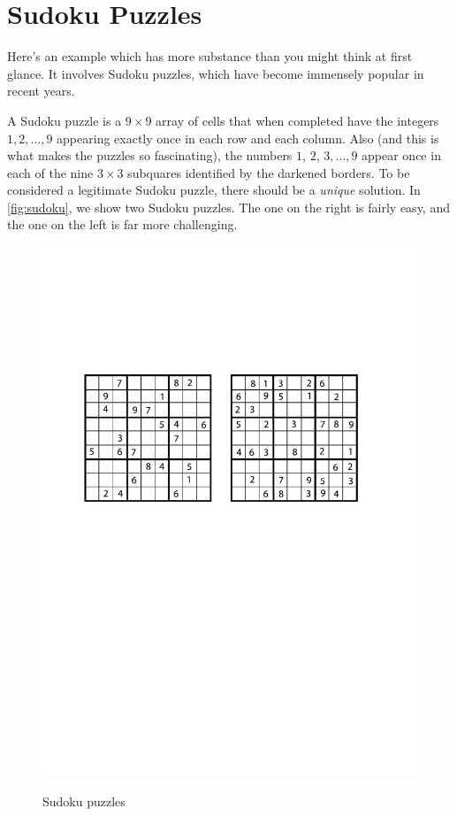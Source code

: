 \section{Sudoku Puzzles}\label{s:intro:sudoku}

Here's an example which has more substance than you might
think at first glance.  It involves Sudoku puzzles, which
have become immensely popular in recent years.
\begin{example}
  A Sudoku puzzle is a $9\times 9$ array of cells that when completed
  have the integers $1,2,\dots,9$ appearing exactly once in each row
  and each column.  Also (and this is what makes the puzzles so
  fascinating), the numbers $1$, $2$, $3,\dots,9$ appear once in each
  of the nine $3\times 3$ subquares identified by the darkened
  borders.  To be considered a legitimate Sudoku puzzle, there should
  be a \textit{unique} solution.  In \autoref{fig:sudoku}, we show two
  Sudoku puzzles.  The one on the right is fairly easy, and the one on
  the left is far more challenging.

\begin{figure}[hb]
\begin{center}
\includegraphics[viewport=60 428 509 645, scale=.8]{intro-figs/mysudoku}\\
\end{center}
\caption{Sudoku puzzles}
\label{fig:sudoku}
\end{figure}


\end{example}
